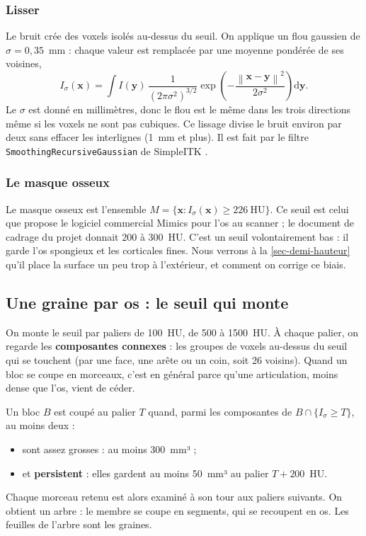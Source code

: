 \documentclass[11pt,a4paper]{article}
\newcommand{\vb}[1]{\mathbf{#1}}
\newcommand{\norm}[1]{\left\lVert #1 \right\rVert}
\begin{document}
\subsubsection{Lisser}

Le bruit crée des voxels isolés au-dessus du seuil. On applique un flou gaussien de $\sigma = 0{,}35$~mm : chaque
valeur est remplacée par une moyenne pondérée de ses voisines,
\begin{equation}
  I_\sigma(\vb{x}) = \int I(\vb{y})\, \frac{1}{(2\pi\sigma^2)^{3/2}} \exp\!\left(-\frac{\norm{\vb{x}-\vb{y}}^2}{2\sigma^2}\right) \mathrm{d}\vb{y}.
\end{equation}
Le $\sigma$ est donné en millimètres, donc le flou est le même dans les trois directions même si les voxels ne sont
pas cubiques. Ce lissage divise le bruit environ par deux sans effacer les interlignes (1~mm et plus). Il est fait par
le filtre \texttt{SmoothingRecursiveGaussian} de SimpleITK \cite{lowekamp2013}.

\subsubsection{Le masque osseux}

Le masque osseux est l'ensemble $M = \{\vb{x} : I_\sigma(\vb{x}) \geq 226~\mathrm{HU}\}$. Ce seuil est celui que
propose le logiciel commercial Mimics pour l'os au scanner ; le document de cadrage du projet donnait 200 à 300~HU.
C'est un seuil volontairement bas : il garde l'os spongieux et les corticales fines. Nous verrons à la
\cref{sec-demi-hauteur} qu'il place la surface un peu trop à l'extérieur, et comment on corrige ce biais.

\subsection{Une graine par os : le seuil qui monte}
\label{sec-graines}

On monte le seuil par paliers de 100~HU, de 500 à 1500~HU. À chaque palier, on regarde les \textbf{composantes
connexes} : les groupes de voxels au-dessus du seuil qui se touchent (par une face, une arête ou un coin, soit 26
voisins). Quand un bloc se coupe en morceaux, c'est en général parce qu'une articulation, moins dense que l'os, vient
de céder.

Un bloc $B$ est coupé au palier $T$ quand, parmi les composantes de $B \cap \{I_\sigma \geq T\}$, au moins deux :
\begin{itemize}
  \item sont assez grosses : au moins 300~mm³ ;
  \item et \textbf{persistent} : elles gardent au moins 50~mm³ au palier $T + 200$~HU.
\end{itemize}
Chaque morceau retenu est alors examiné à son tour aux paliers suivants. On obtient un arbre : le membre se coupe en
segments, qui se recoupent en os. Les feuilles de l'arbre sont les graines.
\end{document}
